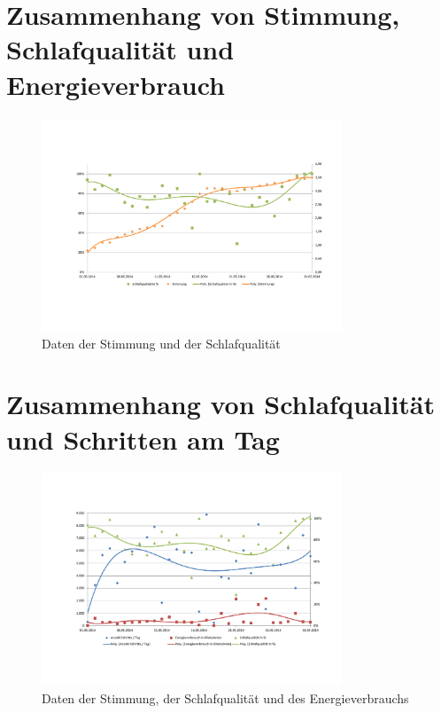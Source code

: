 \section{Zusammenhang von Stimmung, Schlafqualität und Energieverbrauch}
\label{ch:AnalyseUndEvaluierung:sec:KorrelationVonSchlafqualitätUndSchrittenAmTag}

\begin{figure}[H]
\centering
        \includegraphics[angle=270,width=0.8\textwidth]{images/Analyse/Sleep-Mood} 
        \caption[Daten der Stimmung und der Schlafqualität]{Daten der Stimmung und der Schlafqualität}
        \label{fig:ZusammenhangVonStimmungUndSchlafqualität}
\end{figure}

\section{Zusammenhang von Schlafqualität und Schritten am Tag}
\label{ch:AnalyseUndEvaluierung:sec:KorrelationVonSchlafqualitätUndSchrittenAmTag}

\begin{figure}[H]
\centering
        \includegraphics[angle=270,width=0.8\textwidth]{images/Analyse/Sleep-Steps-kcal} 
        \caption[Daten der Stimmung, der Schlafqualität und des Energieverbrauchs]{Daten der Stimmung, der Schlafqualität und des Energieverbrauchs}
        \label{fig:ZusammenhangVonSchlafqualitätSchrittenUndEnergieverbrauchAmTag}
\end{figure}

